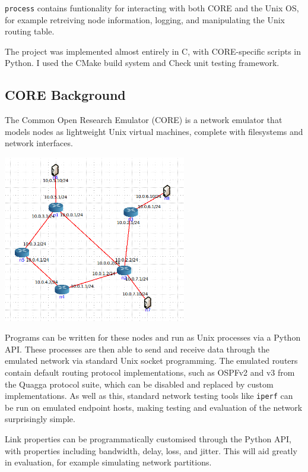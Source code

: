 \documentclass[10pt,twoside,a4paper]{article}
\begin{document}
\texttt{process} contains funtionality for interacting with both CORE and the Unix OS, for example retreiving node information, logging, and manipulating the Unix routing table.

The project was implemented almost entirely in C, with CORE-specific scripts in Python. I used the CMake build system and Check unit testing framework.


\subsection{CORE Background}

The Common Open Research Emulator (CORE) is a network emulator that models nodes as lightweight Unix virtual machines, complete with filesystems and network interfaces.

\begin{minipage}{1\textwidth} \centering
		\includegraphics[width=0.6\textwidth]{6-core}
	\end{minipage}

Programs can be written for these nodes and run as Unix processes via a Python API. These processes are then able to send and receive data through the emulated network via standard Unix socket programming. The emulated routers contain default routing protocol implementations, such as OSPFv2 and v3 from the Quagga protocol suite, which can be disabled and replaced by custom implementations. As well as this, standard network testing tools like \texttt{iperf} can be run on emulated endpoint hosts, making testing and evaluation of the network surprisingly simple.

Link properties can be programmatically customised through the Python API, with properties including bandwidth, delay, loss, and jitter. This will aid greatly in evaluation, for example simulating network partitions.
\end{document}
